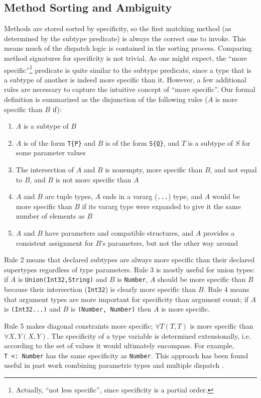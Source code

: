\documentclass[9pt]{sigplanconf}
\begin{document}
\subsection{Method Sorting and Ambiguity}
Methods are stored sorted by specificity, so the first matching method
(as determined by the subtype predicate) is always the correct one to invoke.
This means much of the dispatch logic is contained in the sorting process.
Comparing method signatures for specificity is not trivial. As one might
expect, the ``more specific''\footnote{Actually, ``not less specific'',
since specificity is a partial order.}
predicate is quite similar to the subtype
predicate, since a type that is a subtype of another is indeed more specific
than it. However, a few additional rules are necessary to capture the
intuitive concept of ``more specific''. Our formal definition is
summarized as the disjunction of the following rules ($A$ is more specific
than $B$ if):

\begin{enumerate}
\item $A$ is a subtype of $B$
\item $A$ is of the form {\tt T\{P\}} and $B$ is of the form {\tt S\{Q\}}, and
$T$ is a subtype of $S$ for some parameter values
\item The intersection of $A$ and $B$ is nonempty, more specific than $B$, and
not equal to $B$, and $B$ is not more specific than $A$
\item $A$ and $B$ are tuple types, $A$ ends in a vararg ({\tt ...}) type,
and $A$ would be more specific than $B$ if its vararg type were expanded to
give it the same number of elements as $B$
\item $A$ and $B$ have parameters and compatible structures, and $A$
provides a consistent assignment for $B$'s parameters, but not the other
way around
\end{enumerate}

Rule 2 means that declared subtypes are always more specific than their
declared supertypes regardless of type parameters. Rule 3 is mostly useful for
union types: if $A$ is {\tt Union(Int32,String)} and $B$ is {\tt Number}, $A$
should
be more specific than $B$ because their intersection ({\tt Int32}) is clearly
more specific than $B$. Rule 4 means that argument types are more important for
specificity than argument count; if $A$ is {\tt (Int32...)} and $B$ is
{\tt (Number, Number)} then $A$ is more specific.

Rule 5 makes diagonal constraints more specific; $\forall T (T,T)$ is more
specific than $\forall X,Y (X,Y)$.
The specificity of a type variable is determined extensionally, i.e.
according to the set of values it would ultimately encompass. For example,
{\tt T~<:~Number} has the same specificity as {\tt Number}. This approach
has been found useful in past work combining parametric types and multiple
dispatch \cite{modularmultipledispatch}.
\end{document}
